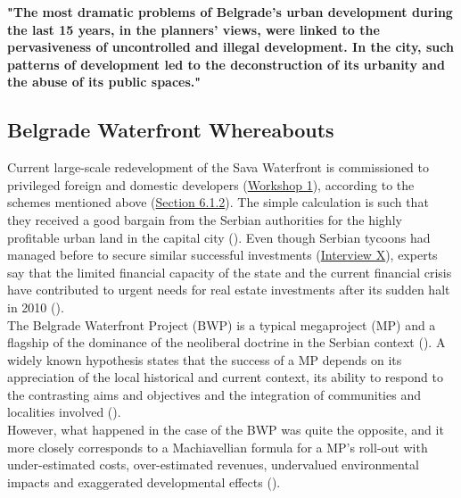 \documentclass[11pt]{report}
\begin{document}
\textbf{"The most dramatic problems of Belgrade’s urban development during the last 15 years, in the planners’ views, were linked to the pervasiveness of uncontrolled and illegal development. In the city, such patterns of development led to the deconstruction of its urbanity and the abuse of its public spaces."} \href{Vujovic}{\citealt{vujovic_belgrades_2007}}

\subsection{Belgrade Waterfront Whereabouts}

Current large-scale redevelopment of the Sava Waterfront is commissioned to privileged foreign and domestic developers
(\href{Expert Workshop}{Workshop 1}),
according to the schemes mentioned above (\href{Section 6.1.2}{Section 6.1.2}).
The simple calculation is such that they received a good bargain from the Serbian authorities for the highly profitable urban land in the capital city (\href{Politika}{\citealt{politika_zemljiste_2015}}).
Even though Serbian tycoons had managed before to secure similar successful investments (\href{InterviewX}{Interview X}),
experts say that the limited financial capacity of the state and  the  current  financial  crisis  have  contributed  to urgent needs for real estate investments after its sudden halt in 2010 (\href{ref}{\citealt{doytchinov_urban_2015}}).
\\

The Belgrade Waterfront Project (BWP) is a typical megaproject (MP) and a flagship of the dominance of the neoliberal doctrine in the Serbian context  (\href{ref}{\citealt{harvey_rebel_2012}}).
A widely known hypothesis states that the success of a MP depends on its appreciation of the local historical and current context, its ability to respond to the contrasting aims and objectives and the integration of communities and localities involved (\href{ref}{\citealt{hoyle_global_2000}}).
\\

However, what happened in the case of the BWP was quite the opposite, and it more closely corresponds to a Machiavellian formula for a MP’s roll-out with under-estimated costs, over-estimated revenues, undervalued environmental impacts and exaggerated developmental effects  (\cite{Flyvbjerg2013}).
\\
\end{document}
